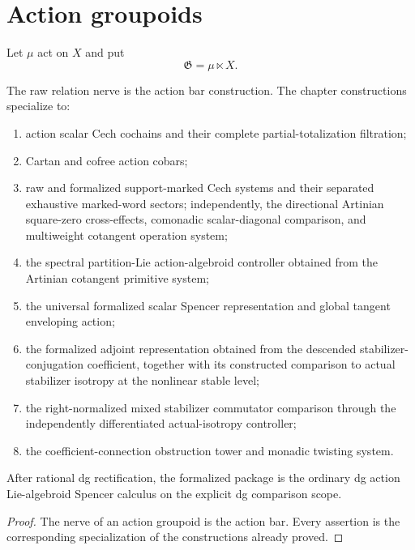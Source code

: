 \section{Action groupoids}
\label{sec:as-action}

Let $\mu$ act on $X$ and put
\[
    \mathfrak G=\mu\ltimes X.
\]

\begin{theorem}
\label{thm:as-action-spencer}
The raw relation nerve is the action bar construction.  The chapter
constructions specialize to:
\begin{enumerate}
    \item action scalar Cech cochains and their complete
    partial-totalization filtration;
    \item Cartan and cofree action cobars;
    \item raw and formalized support-marked Cech systems and their separated
    exhaustive marked-word sectors; independently, the directional Artinian
    square-zero cross-effects, comonadic scalar-diagonal comparison, and
    multiweight cotangent operation system;
    \item the spectral partition-Lie action-algebroid controller obtained from
    the Artinian cotangent primitive system;
    \item the universal formalized scalar Spencer representation and global
    tangent enveloping action;
    \item the formalized adjoint representation obtained from the descended
    stabilizer-conjugation coefficient, together with its constructed
    comparison to actual stabilizer isotropy at the nonlinear stable level;
    \item the right-normalized mixed stabilizer commutator comparison through
    the independently differentiated actual-isotropy controller;
    \item the coefficient-connection obstruction tower and monadic twisting
    system.
\end{enumerate}
After rational dg rectification, the formalized package is the ordinary dg
action Lie-algebroid Spencer calculus on the explicit dg comparison scope.
\end{theorem}

\begin{proof}
The nerve of an action groupoid is the action bar.  Every assertion is the
corresponding specialization of the constructions already proved.
\end{proof}

